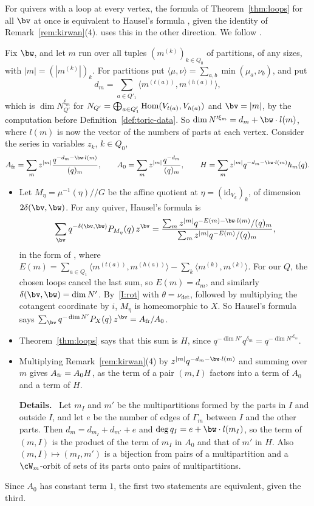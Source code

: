 \documentclass[11pt]{amsart}
\newenvironment{details}{\par\color{black!60!green}\noindent\textbf{Details.}\ }{\par}
\begin{document}
\begin{remark}\label{rem:hausel}
For quivers with a loop at every vertex, the formula of
Theorem~\ref{thm:loops} for all $\bv$ at once is equivalent to Hausel's
formula \cite{hauselBettiNumbers2006}, given the identity of
Remark~\ref{rem:kirwan}(4).   uses this in the other direction.  We
follow \cite[\S3]{nakajimaMultipartitionSpaces2026}.

Fix $\bw$, and let $m$ run over all tuples $(m^{(k)})_{k\in Q_0}$ of
partitions, of any sizes, with $|m|=(|m^{(k)}|)_k$.  For partitions put
$\langle\mu,\nu\rangle=\sum_{a,b}\min(\mu_a,\nu_b)$, and put
\[
 d_m=\sum_{a\in Q'_1}\langle m^{(t(a))},m^{(h(a))}\rangle ,
\]
which is $\dim N_{Q'}^{\xi_m}$ for
$N_{Q'}=\bigoplus_{a\in Q'_1}\operatorname{Hom}(V_{t(a)},V_{h(a)})$ and $\bv=|m|$, by the
computation before Definition~\ref{def:toric-data}.  So $\dim
N'^{\xi_m}=d_m+\bw\cdot l(m)$, where $l(m)$ is now the vector of the numbers of
parts at each vertex.  Consider the series in variables $z_k$, $k\in Q_0$,
\[
 A_{\rm fr}=\sum_m z^{|m|}\frac{q^{-d_m-\bw\cdot l(m)}}{(q)_m},\qquad
 A_0=\sum_m z^{|m|}\frac{q^{-d_m}}{(q)_m},\qquad
 H=\sum_m z^{|m|}q^{-d_m-\bw\cdot l(m)}h_m(q).
\]
\begin{itemize}[leftmargin=2em]
\item Let $M_\eta=\mu^{-1}(\eta)/\!/G$ be the affine quotient at
$\eta=(\mathrm{id}_{V_k})_k$, of dimension $2\delta(\bv,\bw)$.  For any quiver,
Hausel's formula is
\[
 \sum_{\bv}q^{-\delta(\bv,\bw)}P_{M_\eta}(q)\,z^{\bv}
 =\frac{\sum_m z^{|m|}q^{-E(m)-\bw\cdot l(m)}/(q)_m}{\sum_m z^{|m|}q^{-E(m)}/(q)_m},
\]
in the form of , where
$E(m)=\sum_{a\in Q_1}\langle m^{(t(a))},m^{(h(a))}\rangle-\sum_k\langle m^{(k)},m^{(k)}\rangle$.  For our $Q$, the chosen loops cancel the last
sum, so $E(m)=d_m$, and similarly $\delta(\bv,\bw)=\dim N'$.  By~\ref{I:rot}
with $\theta=\nu_{\det}$, followed by multiplying the cotangent coordinate by
$i$, $M_\eta$ is homeomorphic to $X$.  So Hausel's formula says
$\sum_{\bv}q^{-\dim N'}P_X(q)\,z^{\bv}=A_{\rm fr}/A_0$.
\item Theorem~\ref{thm:loops} says that this sum is $H$, since
$q^{-\dim N'}q^{\delta_m}=q^{-\dim N'^{\xi_m}}$.
\item Multiplying Remark~\ref{rem:kirwan}(4) by $z^{|m|}q^{-d_m-\bw\cdot l(m)}$
and summing over $m$ gives $A_{\rm fr}=A_0H$, as the term of a pair $(m,I)$
factors into a term of $A_0$ and a term of $H$.
\begin{details}
Let $m_I$ and $m'$ be
the multipartitions formed by the parts in $I$ and outside $I$, and let $e$
be the number of edges of $\Gamma_m$ between $I$ and the other parts.  Then
$d_m=d_{m_I}+d_{m'}+e$ and $\deg q_I=e+\bw\cdot l(m_I)$, so the term of $(m,I)$
is the product of the term of $m_I$ in $A_0$ and that of $m'$ in $H$.  Also
$(m,I)\mapsto(m_I,m')$ is a bijection from pairs of a multipartition and a
$\cW_m$-orbit of sets of its parts onto pairs of multipartitions.
\end{details}
\end{itemize}
Since $A_0$ has constant term $1$, the first two statements are equivalent,
given the third.


\end{remark}
\end{document}
